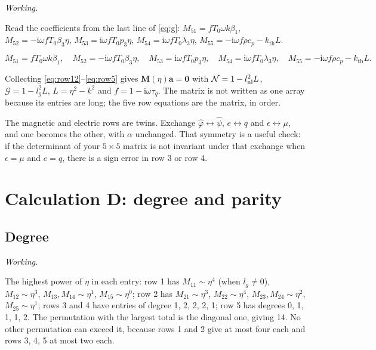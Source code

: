 \documentclass[11pt,a4paper]{article}
\newif\ifshowworked \showworkedtrue
\newenvironment{worked}{\ifshowworked\par\smallskip\noindent\textit{Working.}\par\else\setbox0\vbox\bgroup\fi}{\ifshowworked\par\smallskip\else\egroup\fi}
\newcommand{\Nc}{\mathcal{N}}
\newcommand{\Gc}{\mathcal{G}}
\newcommand{\ii}{\mathrm{i}}
\newcommand{\bp}{\hat\varphi}
\newcommand{\bpsi}{\hat\psi}
\newcommand{\kB}{k_{\mathrm{th}}}
\newcommand{\aME}{\alpha}
\begin{document}
\begin{worked}
Read the coefficients from the last line of \eqref{eq:g}: $M_{51}=fT_0\omega k\beta_1$,
$M_{52}=-\ii\omega fT_0\beta_3\eta$, $M_{53}=\ii\omega fT_0p_3\eta$, $M_{54}=\ii\omega fT_0\lambda_3\eta$,
$M_{55}=-\ii\omega f\rho c_p-\kB L$.
\end{worked}

\noindent
\begin{equation}\label{eq:row5}
M_{51}=fT_0\omega k\beta_1,\quad M_{52}=-\ii\omega fT_0\beta_3\eta,\quad
M_{53}=\ii\omega fT_0p_3\eta,\quad M_{54}=\ii\omega fT_0\lambda_3\eta,\quad
M_{55}=-\ii\omega f\rho c_p-\kB L .
\end{equation}

\noindent Collecting \eqref{eq:row12}--\eqref{eq:row5} gives $\mathbf M(\eta)\mathbf a=\mathbf 0$ with
$\Nc=1-l_{\rm nl}^2L$, $\Gc=1-l_g^2L$, $L=\eta^2-k^2$ and $f=1-\ii\omega\tau_q$. The matrix is not written
as one array because its entries are long; the five row equations are the matrix, in order.

The magnetic and electric rows are twins. Exchange $\bp\leftrightarrow\bpsi$, $e\leftrightarrow q$ and
$\epsilon\leftrightarrow\mu$, and one becomes the other, with $\aME$ unchanged. That symmetry is a useful
check: if the determinant of your $5\times5$ matrix is not invariant under that exchange when
$\epsilon=\mu$ and $e=q$, there is a sign error in row 3 or row 4.

\section{Calculation D: degree and parity}\label{sec:D}

\subsection{Degree}

\begin{worked}
The highest power of $\eta$ in each entry: row 1 has $M_{11}\sim\eta^4$ (when $l_g\ne0$), $M_{12}\sim\eta^3$,
$M_{13},M_{14}\sim\eta^1$, $M_{15}\sim\eta^0$; row 2 has $M_{21}\sim\eta^3$, $M_{22}\sim\eta^4$,
$M_{23},M_{24}\sim\eta^2$, $M_{25}\sim\eta^1$; rows 3 and 4 have entries of degree 1, 2, 2, 2, 1; row 5 has
degrees 0, 1, 1, 1, 2. The permutation with the largest total is the diagonal one, giving 14. No other
permutation can exceed it, because rows 1 and 2 give at most four each and rows 3, 4, 5 at most two each.
\end{worked}
\end{document}
